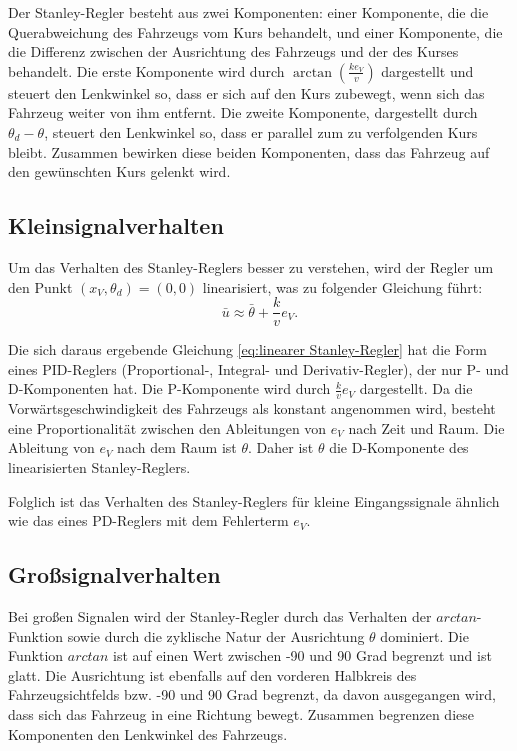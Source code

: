 \documentclass[arbeit=studie,oneside,BCOR=12mm]{ArbeitRST}
\begin{document}
Der Stanley-Regler besteht aus zwei Komponenten: einer Komponente, die die
Querabweichung des Fahrzeugs vom Kurs behandelt, und einer Komponente, die die
Differenz zwischen der Ausrichtung des Fahrzeugs und der des Kurses behandelt.
Die erste Komponente wird durch $\arctan(\frac{ke_{V}}{v})$ dargestellt und
steuert den Lenkwinkel so, dass er sich auf den Kurs zubewegt, wenn sich das
Fahrzeug weiter von ihm entfernt. Die zweite Komponente, dargestellt durch
$\theta_d - \theta$, steuert den Lenkwinkel so, dass er parallel zum zu
verfolgenden Kurs bleibt. Zusammen bewirken diese beiden Komponenten, dass
das Fahrzeug auf den gewünschten Kurs gelenkt wird. \cite{steering-methods}


\subsection{Kleinsignalverhalten}


Um das Verhalten des Stanley-Reglers besser zu verstehen, wird der Regler um
den Punkt $\left(x_V, \theta_d\right) = \left(0, 0\right)$
linearisiert, was zu folgender Gleichung führt: 
\begin{equation} \bar{u} \approx \bar{\theta} + \frac{k}{v}e_{V}. 
    \label{eq:linearer Stanley-Regler}
\end{equation}

Die sich daraus ergebende Gleichung \eqref{eq:linearer Stanley-Regler} hat die
Form eines PID-Reglers (Proportional-, Integral- und Derivativ-Regler), der nur
P- und D-Komponenten hat. Die P-Komponente wird durch \(\frac{k}{v}e_{V}\)
dargestellt. Da die Vorwärtsgeschwindigkeit des Fahrzeugs als konstant
angenommen wird, besteht eine Proportionalität zwischen den Ableitungen von
\(e_{V}\) nach Zeit und Raum. Die Ableitung von \(e_{V}\) nach dem Raum ist
\(\theta\). Daher ist \(\theta\) die D-Komponente des linearisierten
Stanley-Reglers.

Folglich ist das Verhalten des Stanley-Reglers für kleine Eingangssignale
ähnlich wie das eines PD-Reglers mit dem Fehlerterm \(e_{V}\). 


\subsection{Gro{\ss}signalverhalten}

Bei großen Signalen wird der Stanley-Regler durch das Verhalten der
\(arctan\)-Funktion sowie durch die zyklische Natur der Ausrichtung
\(\theta\) dominiert. Die Funktion \(arctan\) ist auf einen Wert zwischen
-90 und 90 Grad begrenzt und ist glatt. Die Ausrichtung ist ebenfalls auf den
vorderen Halbkreis des Fahrzeugsichtfelds bzw. -90 und 90 Grad begrenzt, da davon ausgegangen wird,
dass sich das Fahrzeug in eine Richtung bewegt. Zusammen begrenzen diese
Komponenten den Lenkwinkel des Fahrzeugs.
\end{document}
